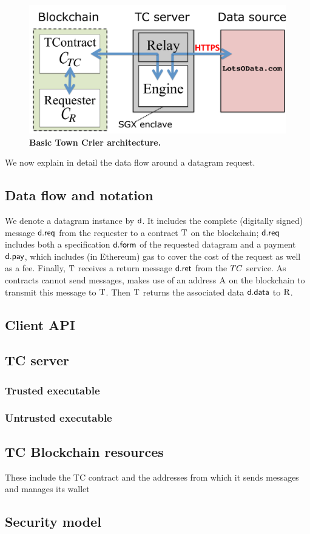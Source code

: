 \begin{figure}[t]
\centering
\includegraphics[width=\columnwidth]{OverviewFig}
\caption{{\bf Basic Town Crier architecture.}}
\label{fig:schematic}
\end{figure}

We now explain in detail the data flow around a datagram request. 

\subsection{Data flow and notation}


We denote a datagram instance by ${\sf d}$. It includes the complete (digitally signed) message ${\sf d.req}$ from the requester to a \tc contract $\tcont$ on the blockchain; ${\sf d.req}$ includes both a specification ${\sf d.form}$ of the requested datagram and a payment ${\sf d.pay}$, which includes (in Ethereum) gas to cover the cost of the request as well as a fee. Finally, $\tcont$ receives a return message ${\sf d.ret}$ from the $TC$ service. As contracts cannot send messages, \tc makes use of an address $\tcadd$ on the blockchain to transmit this message to $\tcont$. Then $\tcont$ returns the associated data ${\sf d.data}$ to $\reqcont$. 



\subsection{Client API}
\subsection{TC server}
\subsubsection{Trusted executable}
\subsubsection{Untrusted executable}
\subsection{TC Blockchain resources}
These include the TC contract and the addresses from which it sends messages and manages its wallet
\subsection{Security model}


